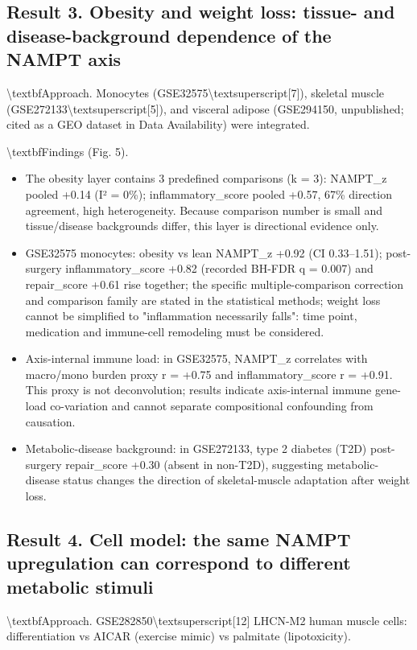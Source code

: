 \documentclass[11pt]{article}
\begin{document}
\subsection*{Result 3. Obesity and weight loss: tissue- and disease-background dependence of the NAMPT axis}
\textbackslash{}textbf{Approach.} Monocytes (GSE32575\textbackslash{}textsuperscript{[7]}), skeletal muscle (GSE272133\textbackslash{}textsuperscript{[5]}), and visceral adipose (GSE294150, unpublished; cited as a GEO dataset in Data Availability) were integrated.

\textbackslash{}textbf{Findings (Fig. 5).}

\begin{itemize}\setlength{\itemsep}{1pt}
\item The obesity layer contains 3 predefined comparisons (k = 3): NAMPT\_z pooled +0.14 (I² = 0\%); inflammatory\_score pooled +0.57, 67\% direction agreement, high heterogeneity. Because comparison number is small and tissue/disease backgrounds differ, this layer is directional evidence only.
\item GSE32575 monocytes: obesity vs lean NAMPT\_z +0.92 (CI 0.33–1.51); post-surgery inflammatory\_score +0.82 (recorded BH-FDR q = 0.007) and repair\_score +0.61 rise together; the specific multiple-comparison correction and comparison family are stated in the statistical methods; weight loss cannot be simplified to "inflammation necessarily falls": time point, medication and immune-cell remodeling must be considered.
\item Axis-internal immune load: in GSE32575, NAMPT\_z correlates with macro/mono burden proxy r = +0.75 and inflammatory\_score r = +0.91. This proxy is not deconvolution; results indicate axis-internal immune gene-load co-variation and cannot separate compositional confounding from causation.
\item Metabolic-disease background: in GSE272133, type 2 diabetes (T2D) post-surgery repair\_score +0.30 (absent in non-T2D), suggesting metabolic-disease status changes the direction of skeletal-muscle adaptation after weight loss.
\end{itemize}
\subsection*{Result 4. Cell model: the same NAMPT upregulation can correspond to different metabolic stimuli}
\textbackslash{}textbf{Approach.} GSE282850\textbackslash{}textsuperscript{[12]} LHCN-M2 human muscle cells: differentiation vs AICAR (exercise mimic) vs palmitate (lipotoxicity).
\end{document}
